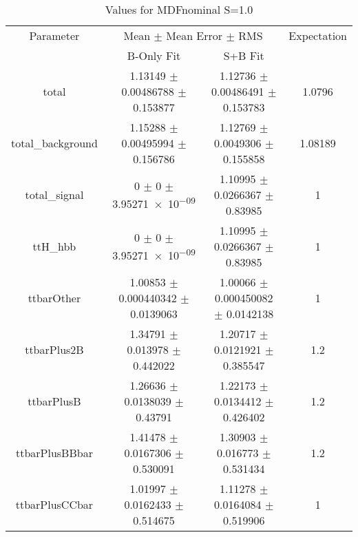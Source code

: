 \begin{table}
\centering
\caption{Values for MDFnominal S=1.0}
\begin{tabular}{cccc}
\toprule
Parameter & \multicolumn{2}{c}{Mean $\pm$ Mean Error $\pm$ RMS} & Expectation\\
 & B-Only Fit & S+B Fit & \\
\midrule
total & \num{1.13149} $\pm$ \num{0.00486788} $\pm$ \num{0.153877} & \num{1.12736} $\pm$ \num{0.00486491} $\pm$ \num{0.153783} & \num{1.0796}\\
total\_background & \num{1.15288} $\pm$ \num{0.00495994} $\pm$ \num{0.156786} & \num{1.12769} $\pm$ \num{0.0049306} $\pm$ \num{0.155858} & \num{1.08189}\\
total\_signal & \num{0} $\pm$ \num{0} $\pm$ \num{3.95271e-09} & \num{1.10995} $\pm$ \num{0.0266367} $\pm$ \num{0.83985} & \num{1}\\
ttH\_hbb & \num{0} $\pm$ \num{0} $\pm$ \num{3.95271e-09} & \num{1.10995} $\pm$ \num{0.0266367} $\pm$ \num{0.83985} & \num{1}\\
ttbarOther & \num{1.00853} $\pm$ \num{0.000440342} $\pm$ \num{0.0139063} & \num{1.00066} $\pm$ \num{0.000450082} $\pm$ \num{0.0142138} & \num{1}\\
ttbarPlus2B & \num{1.34791} $\pm$ \num{0.013978} $\pm$ \num{0.442022} & \num{1.20717} $\pm$ \num{0.0121921} $\pm$ \num{0.385547} & \num{1.2}\\
ttbarPlusB & \num{1.26636} $\pm$ \num{0.0138039} $\pm$ \num{0.43791} & \num{1.22173} $\pm$ \num{0.0134412} $\pm$ \num{0.426402} & \num{1.2}\\
ttbarPlusBBbar & \num{1.41478} $\pm$ \num{0.0167306} $\pm$ \num{0.530091} & \num{1.30903} $\pm$ \num{0.016773} $\pm$ \num{0.531434} & \num{1.2}\\
ttbarPlusCCbar & \num{1.01997} $\pm$ \num{0.0162433} $\pm$ \num{0.514675} & \num{1.11278} $\pm$ \num{0.0164084} $\pm$ \num{0.519906} & \num{1}\\
\bottomrule
\end{tabular}
\end{table}